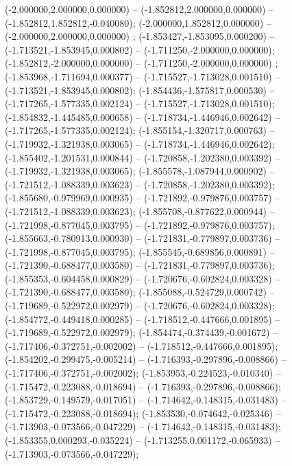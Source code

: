  (-2.000000,2.000000,0.000000) -- (-1.852812,2.000000,0.000000) -- (-1.852812,1.852812,-0.040080);
 (-2.000000,1.852812,0.000000) -- (-2.000000,2.000000,0.000000) ;
 (-1.853427,-1.853095,0.000200) -- (-1.713521,-1.853945,0.000802) -- (-1.711250,-2.000000,0.000000);
 (-1.852812,-2.000000,0.000000) -- (-1.711250,-2.000000,0.000000) ;
 (-1.853968,-1.711694,0.000377) -- (-1.715527,-1.713028,0.001510) -- (-1.713521,-1.853945,0.000802);
 (-1.854436,-1.575817,0.000530) -- (-1.717265,-1.577335,0.002124) -- (-1.715527,-1.713028,0.001510);
 (-1.854832,-1.445485,0.000658) -- (-1.718734,-1.446946,0.002642) -- (-1.717265,-1.577335,0.002124);
 (-1.855154,-1.320717,0.000763) -- (-1.719932,-1.321938,0.003065) -- (-1.718734,-1.446946,0.002642);
 (-1.855402,-1.201531,0.000844) -- (-1.720858,-1.202380,0.003392) -- (-1.719932,-1.321938,0.003065);
 (-1.855578,-1.087944,0.000902) -- (-1.721512,-1.088339,0.003623) -- (-1.720858,-1.202380,0.003392);
 (-1.855680,-0.979969,0.000935) -- (-1.721892,-0.979876,0.003757) -- (-1.721512,-1.088339,0.003623);
 (-1.855708,-0.877622,0.000944) -- (-1.721998,-0.877045,0.003795) -- (-1.721892,-0.979876,0.003757);
 (-1.855663,-0.780913,0.000930) -- (-1.721831,-0.779897,0.003736) -- (-1.721998,-0.877045,0.003795);
 (-1.855545,-0.689856,0.000891) -- (-1.721390,-0.688477,0.003580) -- (-1.721831,-0.779897,0.003736);
 (-1.855353,-0.604458,0.000829) -- (-1.720676,-0.602824,0.003328) -- (-1.721390,-0.688477,0.003580);
 (-1.855088,-0.524729,0.000742) -- (-1.719689,-0.522972,0.002979) -- (-1.720676,-0.602824,0.003328);
 (-1.854772,-0.449418,0.000285) -- (-1.718512,-0.447666,0.001895) -- (-1.719689,-0.522972,0.002979);
 (-1.854474,-0.374439,-0.001672) -- (-1.717406,-0.372751,-0.002002) -- (-1.718512,-0.447666,0.001895);
 (-1.854202,-0.299475,-0.005214) -- (-1.716393,-0.297896,-0.008866) -- (-1.717406,-0.372751,-0.002002);
 (-1.853953,-0.224523,-0.010340) -- (-1.715472,-0.223088,-0.018694) -- (-1.716393,-0.297896,-0.008866);
 (-1.853729,-0.149579,-0.017051) -- (-1.714642,-0.148315,-0.031483) -- (-1.715472,-0.223088,-0.018694);
 (-1.853530,-0.074642,-0.025346) -- (-1.713903,-0.073566,-0.047229) -- (-1.714642,-0.148315,-0.031483);
 (-1.853355,0.000293,-0.035224) -- (-1.713255,0.001172,-0.065933) -- (-1.713903,-0.073566,-0.047229);

